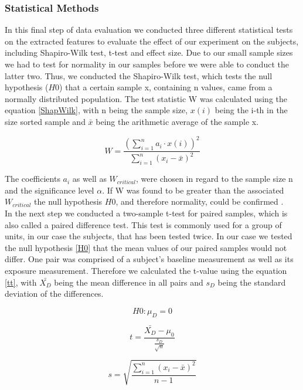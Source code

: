 \subsubsection{Statistical Methods}
In this final step of data evaluation we conducted three different statistical tests on the extracted features to evaluate the effect of our experiment on the subjects, including Shapiro-Wilk test, t-test and effect size. 
Due to our small sample sizes we had to test for normality in our samples before we were able to conduct the latter two. Thus, we conducted the Shapiro-Wilk test, which tests the null hypothesis ($H0$) that a certain sample x, containing n values, came from a normally distributed population. The test statistic W was calculated using the equation \ref{ShapWilk}, with n being the sample size, $x(i)$ being the i-th in the size sorted sample and $\bar{x}$ being the arithmetic average of the sample x. 

\begin{equation}\label{ShapWilk}
W = \frac{(\sum\limits_{i=1}^n a_{i} \cdot x(i))^{2}}{\sum\limits_{i=1}^n (x_{i}-\bar{x} )^{2}}
\end{equation}

The coefficients $a_{i}$ as well as $W_{critical}$, were chosen in regard to the sample size n and the significance level $\alpha$. If W was found to be greater than the associated $W_{critical}$ the null hypothesis $H0$, and therefore normality, could be  confirmed \cite{SHAPIROWILK}.\\
In the next step we conducted a two-sample t-test for paired samples, which is also called a paired difference test. This test is commonly used for a group of units, in our case the subjects, that has been tested twice. In our case we tested the null hypothesis \ref{H0} that the mean values of our paired samples would not differ. One pair was comprised of a subject's  baseline measurement as well as its exposure measurement. Therefore we calculated the t-value using the equation \ref{tt}, with $\bar{X_{D}}$ being the mean difference in all pairs and $s_{D}$ being the standard deviation of the differences.

\begin{equation}
H0: \mu_{D} = 0
\end{equation}

\begin{equation}\label{tt}
t = \frac{\bar{X_{D}}-\mu_{0}}{\frac{s_{D}}{\sqrt{n}}}
\end{equation}

\begin{equation}\label{std}
s = \sqrt{\frac{\sum\limits_{i=1}^n (x_{i}-\bar{x})^{2}}{n-1}}
\end{equation}

